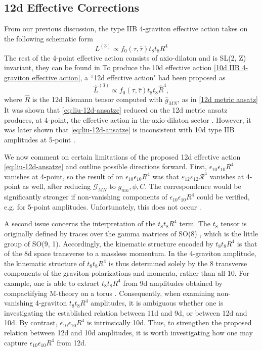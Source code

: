 \subsection{12d Effective Corrections}
From our previous discussion, the type IIB 4-graviton effective action takes on the following schematic form \cite{Kehagias:1997cq,Green:1997tv}
\begin{equation}
L^{(3)} \propto f_0(\tau,\bar\tau)t_8t_8 R^4
\label{10d IIB 4-graviton effective action}
\end{equation}
The rest of the 4-point effective action consists of axio-dilaton and is SL(2, Z) invariant, they can be found in \cite{Policastro:2006vt,Policastro:2008hg}
To produce the 10d effective action \eqref{10d IIB 4-graviton effective action},
a ``12d effective action" had been proposed as \cite{Minasian:2015bxa} 
\begin{equation}
\hat{L}^{(3)} \propto f_0(\tau,\bar\tau)t_8t_8 \hat{R}^4,
\label{eq:liu-12d-ansatze}
\end{equation}
where $\hat{R}$ is the 12d Riemann tensor computed with $\hat{g}_{MN}$, as in \eqref{12d metric ansatz}
It was shown that \eqref{eq:liu-12d-ansatze} reduced on the 12d metric ansatz  produces, at 4-point, the effective action in the axio-dilaton sector \cite{Policastro:2006vt,Policastro:2008hg}.
However, it was later shown that \eqref{eq:liu-12d-ansatze} is inconsistent with 10d type IIB amplitudes at 5-point \cite{Liu:2025uqu}.

We now comment on certain limitations of the proposed 12d effective action \eqref{eq:liu-12d-ansatze} and outline possible directions forward.
First, $\epsilon_{10}\epsilon_{10}R^4$ vanishes at 4-point, so the result of \cite{Minasian:2015bxa} on $\epsilon_{10}\epsilon_{10}R^4$ was that $\varepsilon_{12}\varepsilon_{12}\mathcal R^4$ vanishes at 4-point as well, after reducing $\mathcal G_{MN}$ to $g_{mn},\phi,C$.
The correspondence would be significantly stronger if non-vanishing components of $\epsilon_{10}\epsilon_{10}R^4$ could be verified, e.g. for 5-point amplitudes.
Unfortunately, this does not occur \cite{Liu:2025uqu}.

A second issue concerns the interpretation of the $t_8t_8 R^4$ term.
The $t_8$ tensor is originally defined by traces over the gamma matrices of SO(8) \cite{Schwarz:1982jn}, which is the little group of SO(9, 1).
Accordingly, the kinematic structure encoded by $t_8t_8R^4$ is that of the 8d space transverse to a massless momentum.
In the 4-graviton amplitude, the kinematic structure of $t_8t_8 R^4$ is thus determined solely by the 8 transverse components of the graviton polarizations and momenta, rather than all 10.
For example, one is able to extract $t_8t_8 R^4$ from 9d amplitudes obtained by compactifying M-theory on a torus \cite{Green:1997as}.
Consequently, when examining non-vanishing 4-graviton $t_8t_8R^4$ amplitudes, it is ambiguous whether one is investigating the established relation between 11d and 9d, or between 12d and 10d.
By contrast, $\epsilon_{10}\epsilon_{10}R^4$ is intrinsically 10d.
Thus, to strengthen the proposed relation between 12d and 10d amplitudes, it is worth investigating how one may capture $\epsilon_{10}\epsilon_{10}R^4$ from 12d.

